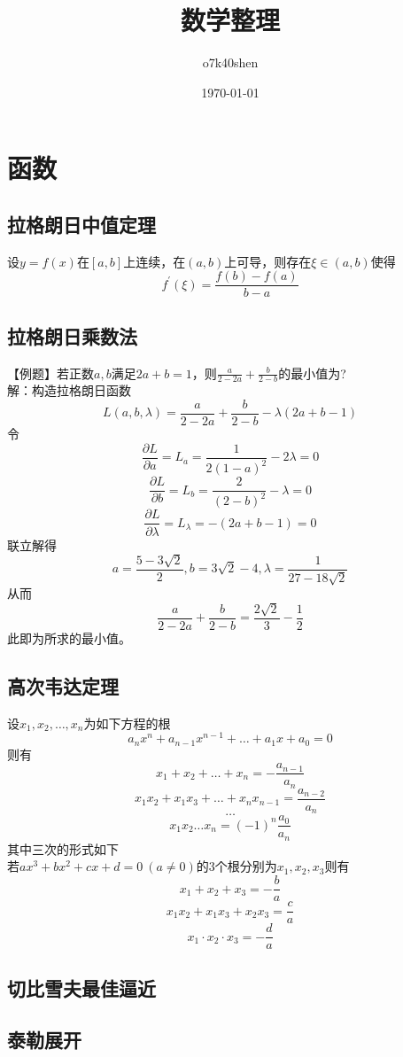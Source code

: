 \documentclass[UTF8]{ctexart}
\title{数学整理}
\author{o7k40shen}
\date{\today}
\begin{document}
    \maketitle
    \tableofcontents
    \newpage
    \section{函数}
		\subsection{拉格朗日中值定理}
			设$y=f(x)$在$[a,b]$上连续，在$(a,b)$上可导，则存在$\xi \in (a,b)$使得
			\[f^{'}(\xi)=\frac{f(b)-f(a)}{b-a}\]
		\subsection{拉格朗日乘数法}
			【例题】若正数$a,b$满足$2a+b=1$，则$\frac{a}{2-2a}+\frac{b}{2-b}$的最小值为?\\
			解：构造拉格朗日函数
			\[L(a,b,\lambda)=\frac{a}{2-2a}+\frac{b}{2-b}-\lambda(2a+b-1)\]
			令
			\[\frac{\partial L}{\partial a}=L_a=\frac{1}{2(1-a)^2}-2\lambda=0\]
			\[\frac{\partial L}{\partial b}=L_b=\frac{2}{(2-b)^2}-\lambda=0\]
			\[\frac{\partial L}{\partial \lambda}=L_\lambda=-(2a+b-1)=0\]
			联立解得
			\[a=\frac{5-3\sqrt{2}}{2},b=3\sqrt{2}-4,\lambda=\frac{1}{27-18\sqrt{2}}\]
			从而
			\[\frac{a}{2-2a}+\frac{b}{2-b}=\frac{2\sqrt{2}}{3}-\frac{1}{2}\]
			此即为所求的最小值。
		\subsection{高次韦达定理}
			设$x_1,x_2,\dots,x_n$为如下方程的根
			\[a_n x^n+a_{n-1} x^{n-1}+\dots+a_1 x+a_0=0\]
			则有
			\[x_1+x_2+\dots+x_n=-\frac{a_{n-1}}{a_n}\]
			\[x_1 x_2+x_1 x_3+\dots+x_n x_{n-1}=\frac{a_{n-2}}{a_n}\]
			\[\dots\]
			\[x_1 x_2\dots x_n=(-1)^n \frac{a_0}{a_n}\]
			其中三次的形式如下\\
			若$ax^3+bx^2+cx+d=0\ (a\neq 0)$的3个根分别为$x_1,x_2,x_3$则有
			\[x_1+x_2+x_3=-\frac{b}{a}\]
			\[x_1 x_2+x_1 x_3+x_2 x_3=\frac{c}{a}\]
			\[x_1\cdot x_2\cdot x_3=-\frac{d}{a}\]		
		\subsection{切比雪夫最佳逼近}
		\subsection{泰勒展开}
\end{document}
